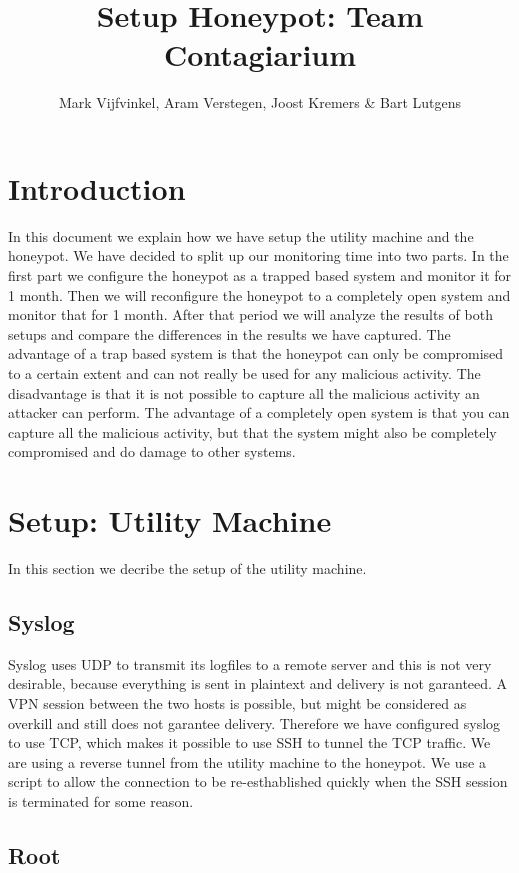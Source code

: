 \documentclass[11pt]{article} %
\title{Setup Honeypot: Team Contagiarium}
\author{Mark Vijfvinkel, Aram Verstegen, Joost Kremers \& Bart Lutgens}
\begin{document}
\maketitle

\section{Introduction}

In this document we explain how we have setup the utility machine and the honeypot. 
We have decided to split up our monitoring time into two parts. In the first part we configure the honeypot as a trapped based system and monitor it for 1 month.
Then we will reconfigure the honeypot to a completely open system and monitor that for 1 month. 
After that period we will analyze the results of both setups and compare the differences in the results we have captured. 
The advantage of a trap based system is that the honeypot can only be compromised to a certain extent and can not really be used for any malicious activity.
The disadvantage is that it is not possible to capture all the malicious activity an attacker can perform.
The advantage of a completely open system is that you can capture all the malicious activity, but that the system might also be completely compromised and do damage to other systems.


\section{Setup: Utility Machine}

In this section we decribe the setup of the utility machine.

\subsection{Syslog}
Syslog uses UDP to transmit its logfiles to a remote server and this is not very desirable, because everything is sent in plaintext and delivery is not garanteed.
A VPN session between the two hosts is possible, but might be considered as overkill and still does not garantee delivery.
Therefore we have configured syslog to use TCP, which makes it possible to use SSH to tunnel the TCP traffic.
We are using a reverse tunnel from the utility machine to the honeypot.
We use a script to allow the connection to be re-esthablished quickly when the SSH session is terminated for some reason. 
\cite{Remote_logging}

\subsection{Root}
\end{document}
